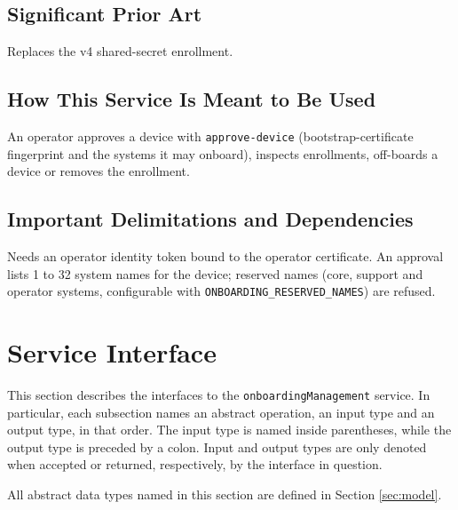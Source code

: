 \documentclass[a4paper]{arrowhead}
\begin{document}
\subsection{Significant Prior Art}

Replaces the v4 shared-secret enrollment.

\subsection{How This Service Is Meant to Be Used}

An operator approves a device with \texttt{approve-\allowbreak{}device} (bootstrap-certificate fingerprint and the systems it may onboard), inspects enrollments, off-boards a device or removes the enrollment.

\subsection{Important Delimitations and Dependencies}
\label{sec:delimitations}

Needs an operator identity token bound to the operator certificate. An approval lists 1 to 32 system names for the device; reserved names (core, support and operator systems, configurable with \texttt{ONBOARDING\_\allowbreak{}RESERVED\_\allowbreak{}NAMES}) are refused.

\newpage

\section{Service Interface}
\label{sec:operations}

This section describes the interfaces to the \texttt{onboarding\allowbreak{}Management} service.
In particular, each subsection names an abstract operation, an input type and an output type, in that order.
The input type is named inside parentheses, while the output type is preceded by a colon.
Input and output types are only denoted when accepted or returned, respectively, by the interface in question.

All abstract data types named in this section are defined in Section \ref{sec:model}.
\end{document}
